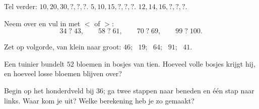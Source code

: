 \begin{exercise}[$\star$]\label{exo:g1:tens:5}
Tel verder: $10, 20, 30, ?, ?, ?$. \quad
$5, 10, 15, ?, ?, ?$. \quad $12, 14, 16, ?, ?, ?$.
\end{exercise}

\begin{exercise}[$\star$]\label{exo:g1:tens:6}
Neem over en vul in met $<$ of $>$:
\[
34 \;?\; 43, \qquad
58 \;?\; 61, \qquad
70 \;?\; 69, \qquad
99 \;?\; 100 .
\]
\end{exercise}

\begin{exercise}[$\star$]\label{exo:g1:tens:7}
Zet op volgorde, van klein naar groot: $46$; \ $19$; \ $64$; \ $91$;
\ $41$.
\end{exercise}

\begin{exercise}[$\star$]\label{exo:g1:tens:8}
Een tuinier bundelt $52$ bloemen in bosjes van tien. Hoeveel volle
bosjes krijgt hij, en hoeveel losse bloemen blijven over?
\end{exercise}

\begin{exercise}[$\star\star$]\label{exo:g1:tens:9}
Begin op het honderdveld bij $36$; ga twee stappen naar beneden en één
stap naar links. Waar kom je uit? Welke berekening heb je zo gemaakt?
\end{exercise}
